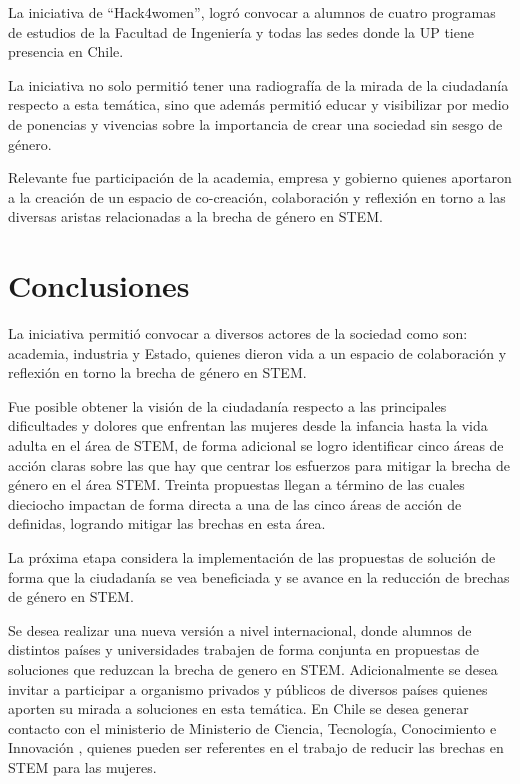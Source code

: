 \documentclass[spanish]{textolivre}
\begin{document}
La iniciativa de “Hack4women”, logró convocar a alumnos de cuatro programas de estudios de la Facultad de Ingeniería y todas las sedes donde la UP tiene presencia en Chile.

La iniciativa no solo permitió tener una radiografía de la mirada de la ciudadanía respecto a esta temática, sino que además permitió educar y visibilizar por medio de ponencias y vivencias sobre la importancia de crear una sociedad sin sesgo de género. 

Relevante fue participación de la academia, empresa y gobierno quienes aportaron a la creación de un espacio de co-creación, colaboración y reflexión en torno a las diversas aristas relacionadas a la brecha de género en STEM.

\section{Conclusiones}\label{sec-organizacao}

La iniciativa permitió convocar a diversos actores de la sociedad como son: academia, industria y Estado, quienes dieron vida a un espacio de colaboración y reflexión en torno la brecha de género en STEM. 

Fue posible obtener la visión de la ciudadanía respecto a las principales dificultades y dolores que enfrentan las mujeres desde la infancia hasta la vida adulta en el área de STEM, de forma adicional se logro identificar cinco áreas de acción claras sobre las que hay que centrar los esfuerzos para mitigar la brecha de género en el área STEM.
Treinta propuestas llegan a término de las cuales dieciocho impactan de forma directa a una de las cinco áreas de acción de definidas, logrando mitigar las brechas en esta área.

La próxima etapa considera la implementación de las propuestas de solución de forma que la ciudadanía se vea beneficiada y se avance en la reducción de brechas de género en STEM.

Se desea realizar una nueva versión a nivel internacional, donde alumnos de distintos países y universidades trabajen de forma conjunta en propuestas de soluciones que reduzcan la brecha de genero en STEM. Adicionalmente se desea invitar a participar a organismo privados y públicos de diversos países quienes aporten su mirada a soluciones en esta temática. En Chile se desea generar contacto con el ministerio de Ministerio de Ciencia, Tecnología, Conocimiento e Innovación \cite{MinisteriodeCienciasyTecnologias2022},  quienes pueden ser referentes en el trabajo de reducir las brechas en STEM para las mujeres.
\end{document}
